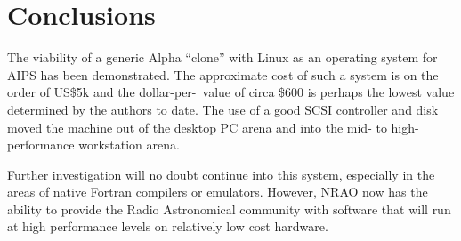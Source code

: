 \section{Conclusions}

The viability of a generic Alpha ``clone'' with Linux as an operating
system for AIPS has been demonstrated.  The approximate cost of such a
system is on the order of US\$5k and the dollar-per-\AMark\ value of circa
\$600 is perhaps the lowest value determined by the authors to date.  The
use of a good SCSI controller and disk moved the machine out of the
desktop PC arena and into the mid- to high-performance workstation arena.

Further investigation will no doubt continue into this system, especially
in the areas of native Fortran compilers or emulators.  However, NRAO now
has the ability to provide the Radio Astronomical community with software
that will run at high performance levels on relatively low cost hardware.










